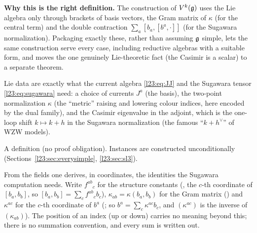 \textbf{Why this is the right definition.} The construction of $V^k(\mathfrak g)$ uses the Lie algebra only through
brackets of basis vectors, the Gram matrix of $\kappa$ (for the central term) and the double contraction
$\sum_a[b_a,[b^a,\cdot]]$ (for the Sugawara normalization). Packaging exactly these, rather than assuming
$\mathfrak g$ simple, lets the same construction serve every case, including reductive algebras with a suitable form, and
moves the one genuinely Lie-theoretic fact (the Casimir is a scalar) to a separate theorem.

\begin{physics}
Lie data are exactly what the current algebra \eqref{l23:eq:JJ} and the Sugawara tensor \eqref{l23:eq:sugawara}
need: a choice of currents $J^a$ (the basis), the two-point normalization $\kappa$ (the ``metric'' raising and
lowering colour indices, here encoded by the dual family), and the Casimir eigenvalue in the adjoint, which is the
one-loop shift $k\mapsto k+h$ in the Sugawara normalization (the famous ``$k+h^\vee$'' of WZW models).
\end{physics}

\begin{status}
A definition (no proof obligation). Instances are constructed unconditionally (Sections~\ref{l23:sec:everysimple},
\ref{l23:sec:sl3}).
\end{status}

From the fields one derives, in coordinates, the identities the Sugawara computation needs. Write
$f^{ab}{}_c$ for the structure constants (, the $c$-th coordinate of $[b_a,b_b]$, so
$[b_a,b_b]=\sum_cf^{ab}{}_cb_c$), $\kappa_{ab}=\kappa(b_a,b_b)$ for the Gram matrix () and $\kappa^{ac}$ for
the $c$-th coordinate of $b^a$ (; so $b^a=\sum_c\kappa^{ac}b_c$, and $(\kappa^{ac})$ is the inverse of
$(\kappa_{ab})$). The position of an index (up or down) carries no meaning beyond this; there is no summation convention, and
every sum is written out.

